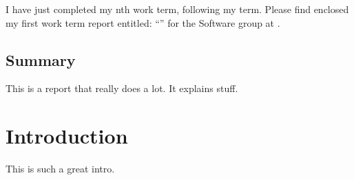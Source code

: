 \documentclass[ece]{uw-wkrpt}
\begin{document}
\begin{letter}
I have just completed my nth work term, following my \theterm{} term.
Please find enclosed my first work term report entitled:
``\thetitle'' for the Software group at \theemployer.  

\end{letter}

\begin{onehalfspacing}


\tableofcontents
\listoffigures
\listoftables
\pagebreak

\section{Summary}
This is a report that really does a lot. It explains stuff.
\end{onehalfspacing}
\mainmatter

\section{Introduction}\label{sec:intro}
This is such a great intro.
\pagebreak 
\end{document}
